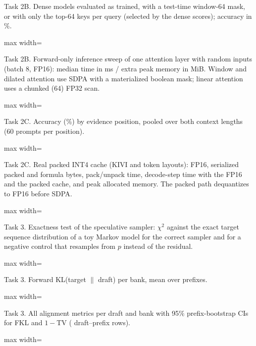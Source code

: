 \documentclass{article}
\newcommand{\tab}[1]{\begin{adjustbox}{max width=\linewidth}\end{adjustbox}}
\begin{document}
\begin{table}[!htb]
\centering\footnotesize
\caption{Task 2B. Dense models evaluated as trained, with a test-time window-64 mask, or with only the top-64 keys per
query (selected by the dense scores); accuracy in \%.}
\label{tab:t2bctl}
\tab{t2b_controls}
\end{table}

\begin{table}[!htb]
\centering\footnotesize
\caption{Task 2B. Forward-only inference sweep of one attention layer with random inputs (batch 8, FP16): median time in
ms / extra peak memory in MiB. Window and dilated attention use SDPA with a materialized boolean mask; linear attention
uses a chunked (64) FP32 scan.}
\label{tab:t2bsweep}
\tab{t2b_sweep}
\end{table}

\begin{table}[!htb]
\centering\footnotesize
\caption{Task 2C. Accuracy (\%) by evidence position, pooled over both context lengths (60 prompts per position).}
\label{tab:t2cpos}
\tab{t2c_position}
\end{table}

\begin{table}[!htb]
\centering\footnotesize
\caption{Task 2C. Real packed INT4 cache (KIVI and token layouts): FP16, serialized packed and formula bytes,
pack/unpack time, decode-step time with the FP16 and the packed cache, and peak allocated memory. The packed path
dequantizes to FP16 before SDPA.}
\label{tab:t2cpack}
\tab{t2c_packing}
\end{table}

\begin{table}[!htb]
\centering\footnotesize
\caption{Task 3. Exactness test of the speculative sampler: $\chi^2$ against the exact target sequence distribution of a
toy Markov model for the correct sampler and for a negative control that resamples from $p$ instead of the residual.}
\label{tab:t3toy}
\tab{t3_toy}
\end{table}

\begin{table}[!htb]
\centering\footnotesize
\caption{Task 3. Forward KL(target $\|$ draft) per bank, mean over prefixes.}
\label{tab:t3fkl}
\tab{t3_align_fkl}
\end{table}

\begin{table}[!htb]
\centering\footnotesize
\caption{Task 3. All alignment metrics per draft and bank with 95\% prefix-bootstrap CIs for FKL and $1-$TV
(\TThreeAlignRows{} draft--prefix rows).}
\label{tab:t3alignfull}
\tab{t3_align_full}
\end{table}
\end{document}
